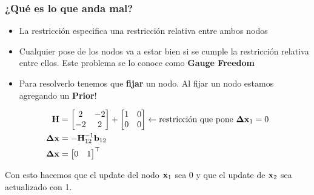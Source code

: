 \begin{frame}
    \frametitle{¿Qué es lo que anda mal?}
    
    \begin{itemize}
        \item La restricción especifica una restricción relativa entre ambos nodos
        \item Cualquier pose de los nodos va a estar bien si se cumple la restricción relativa entre ellos. Este problema se lo conoce como {\bf Gauge Freedom}
        \item Para resolverlo tenemos que {\bf fijar} un nodo. Al fijar un nodo estamos agregando un {\bf Prior}!
    \end{itemize}

    \begin{align*}
        \boldsymbol{\mathbf{H}} &=
        \begin{bmatrix}
            2 & -2\\
            -2 & 2
        \end{bmatrix}
        +
        \begin{bmatrix}
            1 & 0\\
            0 & 0
        \end{bmatrix} \leftarrow \text{restricción que pone } \boldsymbol{\mathbf{\Delta}}\boldsymbol{\mathbf{x}}_{1} = 0\\
        \boldsymbol{\mathbf{\Delta}}\boldsymbol{\mathbf{x}} &= -{\boldsymbol{\mathbf{H}}}^{-1}_{12} \boldsymbol{\mathbf{b}}_{12}\\
        \boldsymbol{\mathbf{\Delta}}\boldsymbol{\mathbf{x}} &=
        \begin{bmatrix}
            0 & 1
        \end{bmatrix}^{\top}
    \end{align*}
    
    Con esto hacemos que el update del nodo $\boldsymbol{\mathbf{x}}_{1}$ sea 0 y que el update de $\boldsymbol{\mathbf{x}}_{2}$ sea actualizado con 1.
\end{frame}


